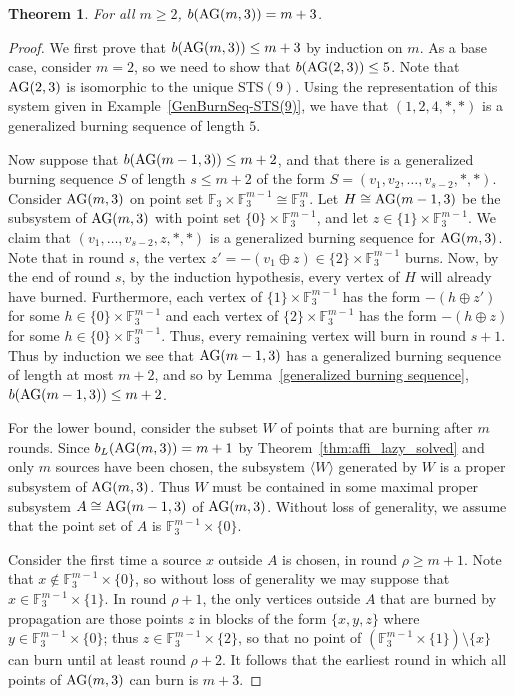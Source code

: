 \documentclass[12pt]{article}
\DeclareMathOperator{\AG}{\rm AG}
\newtheorem{theorem}{Theorem}[section]
\theoremstyle{definition}
\numberwithin{table}{section}
\begin{document}
\begin{theorem}
\label{th:affine_burning_number}
    For all $m \geq 2$, $b(\AG(m,3)) = m+3$.
\end{theorem}
\begin{proof}
We first prove that $b(\AG(m,3)) \leq m+3$ by induction on $m$.  As a base case, consider $m=2$, so we need to show that $b(\AG(2,3))\leq 5$.  Note that $\AG(2,3)$ is isomorphic to the unique STS$(9)$.  Using the representation of this system given in Example~\ref{GenBurnSeq-STS(9)}, we have that $(1,2,4,*,*)$ is a generalized burning sequence of length $5$.  

Now suppose that $b(\AG(m-1,3)) \leq m+2$, and that there is a generalized burning sequence $S$ of length $s \leq m+2$ of the form $S=(v_1,v_2, \ldots, v_{s-2},*,*)$.  Consider $\AG(m,3)$ on point set $\mathbb{F}_3 \times \mathbb{F}_3^{m-1} \cong \mathbb{F}_3^m$.  Let $H \cong \AG(m-1,3)$ be the subsystem of $\AG(m,3)$ with point set $\{0\} \times \mathbb{F}_3^{m-1}$, and let $z \in \{1\} \times \mathbb{F}_3^{m-1}$. 
We claim that $(v_1, \ldots, v_{s-2},z,*,*)$ is a generalized burning sequence for $\AG(m,3)$.   Note that in round $s$, the vertex $z'=-(v_1\oplus z) \in \{2\} \times \mathbb{F}_{3}^{m-1}$ burns. Now, by the end of round $s$, by the induction hypothesis, every vertex of $H$ will already have burned.  Furthermore, each vertex of $\{1\} \times \mathbb{F}_3^{m-1}$ has the form $-(h\oplus z')$ for some $h \in \{0\}\times \mathbb{F}_3^{m-1}$ and each vertex of $\{2\} \times \mathbb{F}_3^{m-1}$ has the form $-(h\oplus z)$ for some $h \in \{0\}\times \mathbb{F}_3^{m-1}$.  Thus, every remaining vertex will burn in round $s+1$.  
Thus by induction we see that $\AG(m-1,3)$ has a generalized burning sequence of length at most $m+2$, and so by Lemma~\ref{generalized burning sequence}, $b(\AG(m-1,3)) \leq m+2$. 

For the lower bound, consider the subset $W$ of points that are burning after $m$ rounds.  Since $b_L(\AG(m,3))=m+1$ by Theorem~\ref{thm:affi_lazy_solved} and only $m$ sources have been chosen, the subsystem $\langle W \rangle$ generated by $W$ is a proper subsystem of $\AG(m,3)$.  Thus $W$ must be contained in some maximal proper subsystem $A\cong \AG(m-1,3)$ of $\AG(m,3)$. Without loss of generality, we assume that the point set of $A$ is $\mathbb{F}_3^{m-1} \times \{0\}$.  

Consider the first time a source $x$ outside $A$ is chosen, in round $\rho \geq m+1$.  Note that $x \notin \mathbb{F}_3^{m-1} \times \{0\}$, so without loss of generality we may suppose that $x \in \mathbb{F}_3^{m-1} \times \{1\}$.  In round $\rho+1$, the only vertices outside $A$ that are burned by propagation are those points $z$ in blocks of the form $\{x,y,z\}$ where $y \in \mathbb{F}_3^{m-1} \times \{0\}$; thus $z \in \mathbb{F}_3^{m-1} \times \{2\}$, so that no point of $(\mathbb{F}_3^{m-1} \times \{1\}) \setminus \{x\}$ can burn until at least round $\rho+2$.  It follows that the earliest round in which all points of $\AG(m,3)$ can burn is $m+3$.
\end{proof}
\end{document}

